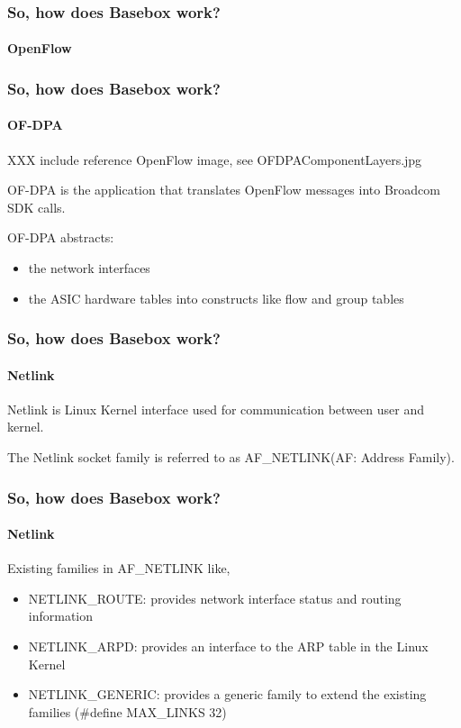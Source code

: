 \documentclass[11pt]{beamer}
\begin{document}
\begin{frame}
\frametitle{So, how does Basebox work?}
\framesubtitle{OpenFlow}

\end{frame}

\begin{frame}
\frametitle{So, how does Basebox work?}
\framesubtitle{OF-DPA}
\begin{minipage}[t]{0.48\linewidth}
	XXX include reference OpenFlow image, see OFDPAComponentLayers.jpg
\end{minipage}\hfill
\begin{minipage}[t]{0.48\linewidth}

   	OF-DPA is the application that translates OpenFlow messages into Broadcom SDK calls.
	
	OF-DPA abstracts:

	\begin{itemize}
	\item the network interfaces

	\item the ASIC hardware tables into constructs like flow and group tables
	\end{itemize}
\end{minipage}\hfill
\end{frame}

\begin{frame}
\frametitle{So, how does Basebox work?}
\framesubtitle{Netlink}

Netlink is Linux Kernel interface used for communication between user and kernel.

The Netlink socket family is referred to as AF\_NETLINK(AF: Address Family).

\end{frame}

\begin{frame}
\frametitle{So, how does Basebox work?}
\framesubtitle{Netlink}

Existing families in AF\_NETLINK like,

\begin{itemize}
\item NETLINK\_ROUTE: provides network interface status and routing information
\item NETLINK\_ARPD: provides an interface to the ARP table in the Linux Kernel
\item NETLINK\_GENERIC: provides a generic family to extend the existing families (\#define MAX\_LINKS 32) %
\end{itemize}

\end{frame}
\end{document}
